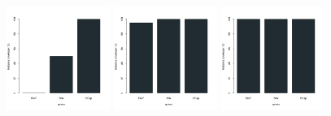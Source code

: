 \begin{figure}[H]
\centering
\includegraphics[width=0.3\textwidth]{img/solver_instance_coverage_b=2_s_1s.png}
\includegraphics[width=0.3\textwidth]{img/solver_instance_coverage_b=2_s_3s.png}
\includegraphics[width=0.3\textwidth]{img/solver_instance_coverage_b=2_s_5s.png}
\caption*{\textsc{Zeitlimit} $1s$ $\quad\quad\quad\thinspace\thinspace\thinspace\thinspace\thinspace$ \textsc{Zeitlimit} $3s$
$\thinspace\thinspace\thinspace\thinspace\thinspace\quad\quad\quad$ \textsc{Zeitlimit} $5s$}
\begin{subfigure}[b]{0.3\textwidth}
\centering
{}
\end{subfigure}
\end{figure}
